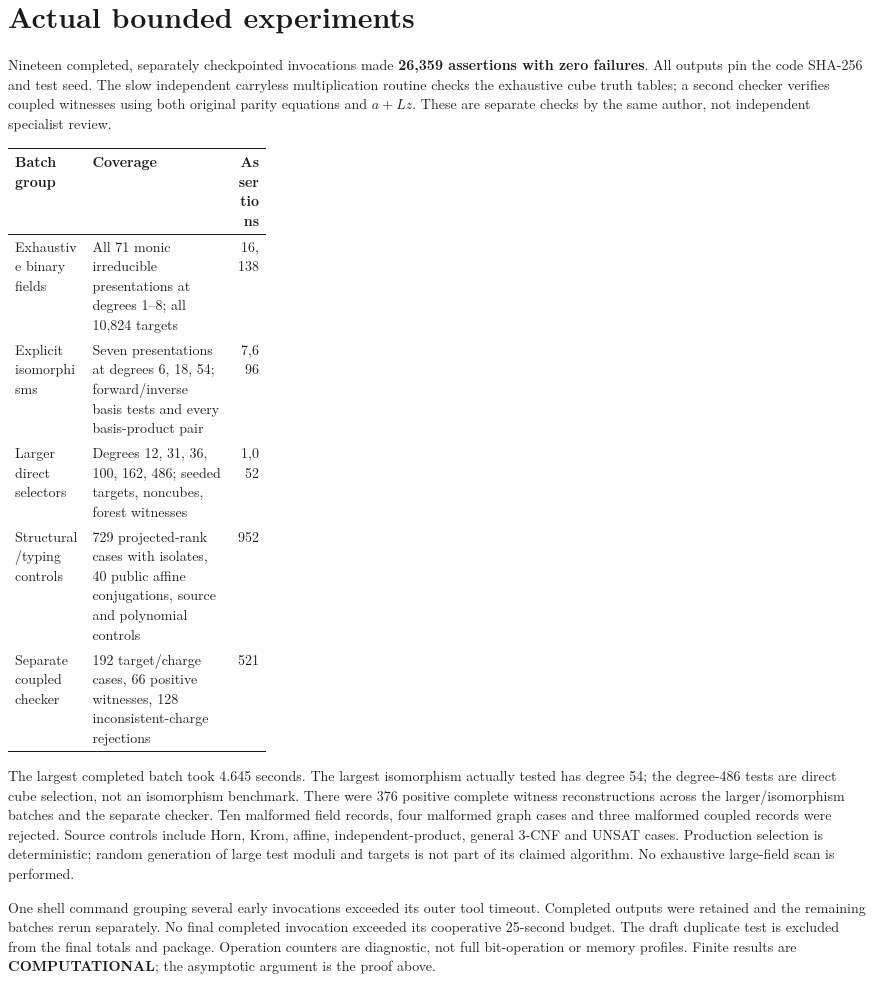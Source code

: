 \documentclass[11pt]{article}
\begin{document}
\section{Actual bounded experiments}
Nineteen completed, separately checkpointed invocations made
\textbf{26,359 assertions with zero failures}. All outputs pin the code
SHA-256 and test seed. The slow independent carryless multiplication routine
checks the exhaustive cube truth tables; a second checker verifies coupled
witnesses using both original parity equations and $a+Lz$. These are separate
checks by the same author, not independent specialist review.
\begin{center}\small
\begin{tabularx}{\linewidth}{p{0.30\linewidth}Xr}\toprule
Batch group & Coverage & Assertions\\\midrule
Exhaustive binary fields & All 71 monic irreducible presentations at degrees
1--8; all 10,824 targets & 16,138\\
Explicit isomorphisms & Seven presentations at degrees 6, 18, 54; forward/inverse
basis tests and every basis-product pair & 7,696\\
Larger direct selectors & Degrees 12, 31, 36, 100, 162, 486; seeded targets,
noncubes, forest witnesses & 1,052\\
Structural/typing controls & 729 projected-rank cases with isolates, 40 public
affine conjugations, source and polynomial controls & 952\\
Separate coupled checker & 192 target/charge cases, 66 positive witnesses,
128 inconsistent-charge rejections & 521\\\bottomrule
\end{tabularx}\end{center}
The largest completed batch took 4.645 seconds. The largest isomorphism
actually tested has degree 54; the degree-486 tests are direct cube selection,
not an isomorphism benchmark. There were 376 positive complete witness
reconstructions across the larger/isomorphism batches and the separate checker.
Ten malformed field records, four malformed graph cases and three malformed
coupled records were rejected. Source controls include Horn, Krom, affine,
independent-product, general 3-CNF and UNSAT cases. Production selection is
deterministic; random generation of large test moduli and targets is not part
of its claimed algorithm. No exhaustive large-field scan is performed.

One shell command grouping several early invocations exceeded its outer tool
timeout. Completed outputs were retained and the remaining batches rerun
separately. No final completed invocation exceeded its cooperative 25-second
budget. The draft duplicate test is excluded from the final totals and package.
Operation counters are diagnostic, not full bit-operation or memory profiles.
Finite results are \textbf{COMPUTATIONAL}; the asymptotic argument is the proof above.
\end{document}

